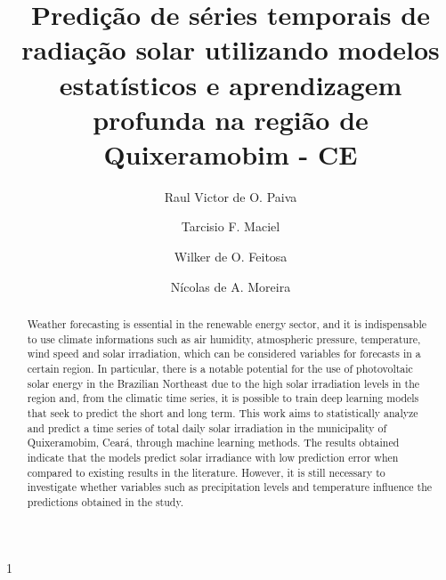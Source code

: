 \documentclass[a4paper]{ifacconf}
\def\portugues{1}
\def\portugues{0}
\begin{document}
	
	
\if\portugues1

% 
	
\begin{frontmatter}

\title{Predição de séries temporais de radiação solar utilizando modelos estatísticos e aprendizagem profunda na região de Quixeramobim - CE} 



\author[First]{Raul Victor de O. Paiva} 
\author[Second]{ Tarcisio F. Maciel} 
\author[Third]{Wilker de O. Feitosa}
\author[Fourth]{Nícolas de A. Moreira}

\address[First]{Departamento de Engenharia de Teleinformática, Universidade Federal do Ceará, CE, (e-mail: raul.paiva@alu.ufc.br).}
\address[Second]{Departamento de Engenharia de Teleinformática, Universidade Federal do Ceará, CE (e-mail: maciel@gtel.ufc.br)}
\address[Third]{Departamento de Engenharia de Teleinformática, Universidade Federal do Ceará, CE (e-mail: wilker@gtel.ufc.br)}
\address[Fourth]{Departamento de Engenharia de Teleinformática, Universidade Federal do Ceará, CE (e-mail: nicolas.araujom@gmail.com)}

\renewcommand{\abstractname}{{\bf Abstract:~}}
\begin{abstract}                %
Weather forecasting is essential in the renewable energy sector, and it is indispensable to use climate informations such as air humidity, atmospheric pressure, temperature, wind speed and solar irradiation, which can be considered variables for forecasts in a certain region. 
In particular, there is a notable potential for the use of photovoltaic solar energy in the Brazilian Northeast due to the high solar irradiation levels in the region and, from the climatic time series, it is possible to train deep learning models that seek to predict the short and long term. This work aims to statistically analyze and predict a time series of total daily solar irradiation in the municipality of Quixeramobim, Ceará, through machine learning methods. The results obtained indicate that the models predict solar irradiance with low prediction error when compared to existing results in the literature. However, it is still necessary to investigate whether variables such as precipitation levels and temperature influence the predictions obtained in the study.


\end{abstract}
\end{frontmatter}
\end{document}
